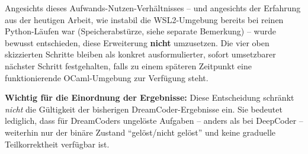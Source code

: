 \documentclass[11pt,a4paper]{article}
\begin{document}
Angesichts dieses Aufwands-Nutzen-Verhältnisses -- und angesichts der
Erfahrung aus der heutigen Arbeit, wie instabil die WSL2-Umgebung bereits
bei reinen Python-Läufen war (Speicherabstürze, siehe separate
Bemerkung) -- wurde bewusst entschieden, diese Erweiterung
\textbf{nicht} umzusetzen. Die vier oben skizzierten Schritte bleiben
als konkret ausformulierter, sofort umsetzbarer nächster Schritt
festgehalten, falls zu einem späteren Zeitpunkt eine funktionierende
OCaml-Umgebung zur Verfügung steht.

\textbf{Wichtig für die Einordnung der Ergebnisse:} Diese Entscheidung
schränkt \emph{nicht} die Gültigkeit der bisherigen DreamCoder-Ergebnisse
ein. Sie bedeutet lediglich, dass für DreamCoders ungelöste Aufgaben --
anders als bei DeepCoder -- weiterhin nur der binäre Zustand
``gelöst/nicht gelöst'' und keine graduelle Teilkorrektheit verfügbar
ist.
\end{document}
